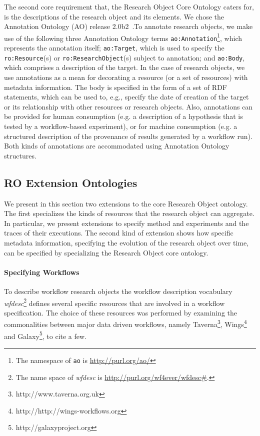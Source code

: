 The second core requirement that, the Research Object Core Ontology caters for, is the descriptions of the research object and its elements. We chose the Annotation Ontology (AO) release 2.0b2~\cite{COG11}.To annotate research objects, we make use of the following three Annotation Ontology terms \texttt{ao:Annotation}\footnote{The namespace of \texttt{ao} is \url{http://purl.org/ao/}}, which represents the annotation itself; \texttt{ao:Target}, which is used to specify the \texttt{ro:Resource}(s) or \texttt{ro:ResearchObject}(s) subject to annotation; and \texttt{ao:Body}, which comprises a description of the target.
In the case of research objects, we use annotations as a mean for decorating a resource (or a set of resources) with metadata information. The body is specified in the form of a set of RDF statements, which can be used to, e.g., specify  the date of creation of the target or its relationship with other resources or research objects. Also, annotations can be provided for human consumption (e.g. a description of a hypothesis that is tested by a workflow-based experiment), or for machine consumption (e.g. a structured description of the provenance of results generated by a workflow run). Both kinds of annotations are accommodated using Annotation Ontology structures.

\subsection{RO Extension Ontologies}
We present in this section two  extensions to the core Research Object ontology. The first specializes the kinds of resources that the research object can aggregate. In particular, we present extensions to specify  method and experiments and the traces of their executions. The second kind of extension shows how specific metadata information, specifying the evolution of the research object over time, can be specified by specializing the Research Object core ontology.

\paragraph{Specifying Workflows}
To describe workflow research objects the workflow description vocabulary \textit{wfdesc}\footnote{The name space of \textit{wfdesc} is \url{http://purl.org/wf4ever/wfdesc\#}.} defines several specific resources that are involved in a workflow specification. The choice of these resources was performed by examining the commonalities between major data driven workflows, namely Taverna\footnote{http://www.taverna.org.uk}, Wings\footnote{http://http://wings-workflows.org} and Galaxy\footnote{http://galaxyproject.org}, to cite a few.

